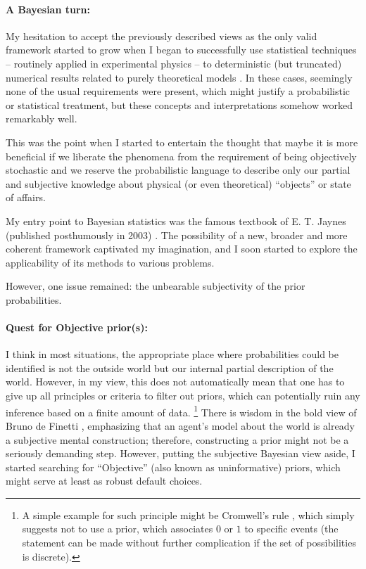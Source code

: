 \documentclass{article}
\theoremstyle{definition}
\begin{document}
\paragraph{A Bayesian turn:}

My hesitation to accept the previously described views as the only valid framework started to grow when I began to successfully use statistical techniques -- routinely applied in experimental physics -- to deterministic (but truncated) numerical results related to purely theoretical models \cite{paper:BajnokKonczeretall}.
In these cases, seemingly none of the usual requirements were present, which might justify a probabilistic or statistical treatment, but these concepts and interpretations somehow worked remarkably well.

This was the point when I started to entertain the thought that maybe it is more beneficial if we liberate the phenomena from the requirement of being objectively stochastic and we reserve the probabilistic language to describe only our partial and subjective knowledge about physical (or even theoretical) ``objects'' or state of affairs.

My entry point to Bayesian statistics was the famous textbook of E. T. Jaynes (published posthumously in 2003) \cite{book:Jaynes}. The possibility of a new, broader and more coherent framework captivated my imagination, and I soon started to explore the applicability of its methods to various problems.

However, one issue remained: the unbearable subjectivity of the prior probabilities.

\paragraph{Quest for Objective prior(s):}

I think in most situations, the appropriate place where probabilities could be identified is not the outside world but our internal partial description of the world.
However, in my view, this does not automatically mean that one has to give up all principles or criteria to filter out priors, which can potentially ruin any inference based on a finite amount of data. \footnote{A simple example for such principle might be Cromwell's rule \cite{book:Lindley,book:BayesianSocialScience}, which simply suggests not to use a prior, which associates $0$ or $1$ to specific events (the statement can be made without further complication if the set of possibilities is discrete).}
There is wisdom in the bold view of Bruno de Finetti \cite{book:deFinetti}, emphasizing that an agent's model about the world is already a subjective mental construction; therefore, constructing a prior might not be a seriously demanding step.
However, putting the subjective Bayesian view aside, I started searching for ``Objective'' (also known as uninformative) priors, which might serve at least as robust default choices. 
\end{document}
